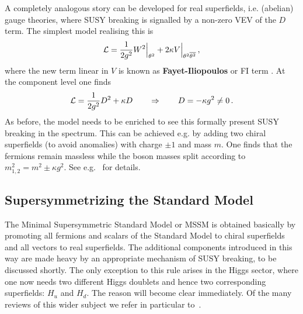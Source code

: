 \documentclass[12pt]{article}
\newcommand{\be}{\begin{equation}}
\newcommand{\ee}{\end{equation}}
\newcommand{\ol}{\overline}
\numberwithin{equation}{section}
\begin{document}
A completely analogous story can be developed for real superfields, i.e. (abelian) gauge theories, where SUSY breaking is signalled by a non-zero VEV of the $D$ term. The simplest model realising this is 
\be
{\cal L}=\frac{1}{2g^2}W^2\Big|_{\theta^2}+2\kappa V\Big|_{\theta^2\ol{\theta^2}}\,,
\ee
where the new term linear in $V$ is known as {\bf Fayet-Iliopoulos} or FI term \cite{Fayet:1974jb}. At the component level one finds
\be
{\cal L}=\frac{1}{2g^2}D^2+\kappa D\qquad\Rightarrow\qquad D=-\kappa g^2\neq 0\,.
\ee
As before, the model needs to be enriched to see this formally present SUSY breaking in the spectrum. This can be achieved e.g. by adding two chiral superfields (to avoid anomalies) with charge $\pm 1$ and mass $m$. One finds that the fermions remain massless while the boson masses split according to $m_{1,2}^2=m^2\pm \kappa g^2$. See e.g.~\cite{Wess:1992cp} for details.






\subsection{Supersymmetrizing the Standard Model}
The Minimal Supersymmetric Standard Model or MSSM is obtained basically by promoting all fermions and scalars of the Standard Model to chiral superfields and all vectors to real superfields. The additional components introduced in this way are made heavy by an appropriate mechanism of SUSY breaking, to be discussed shortly. The only exception to this rule arises in the Higgs sector, where one now needs two different Higgs doublets and hence two corresponding superfields: $H_u$ and $H_d$. The reason will become clear immediately. Of the many reviews of this wider subject we refer in particular to~\cite{Luty:2005sn, Martin:1997ns, Giudice:1998bp}.
\end{document}
